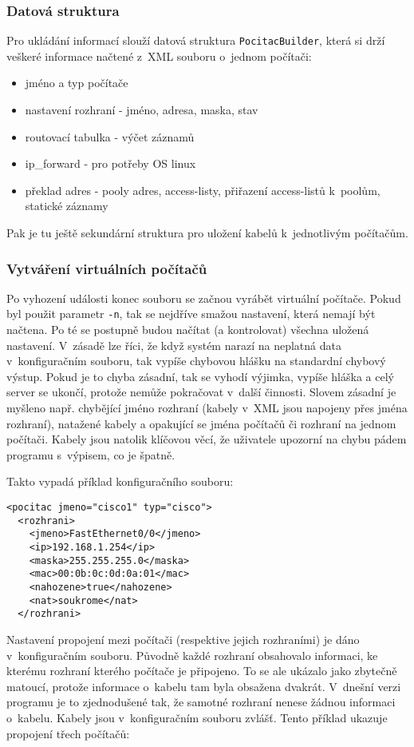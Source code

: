 \subsubsection{Datová struktura}
Pro ukládání informací slouží datová struktura \verb|PocitacBuilder|, která si drží veškeré informace načtené z~XML souboru o~jednom počítači:
\begin{itemize}
 \item jméno a typ počítače
 \item nastavení rozhraní - jméno, adresa, maska, stav
 \item routovací tabulka - výčet záznamů
 \item ip\_forward - pro potřeby OS linux
 \item překlad adres - pooly adres, access-listy, přiřazení access-listů k~poolům, statické záznamy
\end{itemize}

Pak je tu ještě sekundární struktura pro uložení kabelů k~jednotlivým počítačům.

\subsubsection{Vytváření virtuálních počítačů}
Po vyhození události konec souboru se začnou vyrábět virtuální počítače. Pokud byl použit parametr \verb|-n|, tak se nejdříve smažou nastavení, která nemají být načtena. Po té se postupně budou načítat (a kontrolovat) všechna uložená nastavení. V~zásadě lze říci, že když systém narazí na neplatná data v~konfiguračním souboru, tak vypíše chybovou hlášku na standardní chybový výstup. Pokud je to chyba zásadní, tak se vyhodí výjimka, vypíše hláška a celý server se ukončí, protože nemůže pokračovat v~další činnosti. Slovem zásadní je myšleno např. chybějící jméno rozhraní (kabely v~XML jsou napojeny přes jména rozhraní), natažené kabely a opakující se jména počítačů či rozhraní na jednom počítači. Kabely jsou natolik klíčovou věcí, že uživatele upozorní na chybu pádem programu s~výpisem, co je špatně. 

Takto vypadá příklad konfiguračního souboru:
\begin{verbatim}
<pocitac jmeno="cisco1" typ="cisco">
  <rozhrani>
    <jmeno>FastEthernet0/0</jmeno>
    <ip>192.168.1.254</ip>
    <maska>255.255.255.0</maska>
    <mac>00:0b:0c:0d:0a:01</mac>
    <nahozene>true</nahozene>
    <nat>soukrome</nat>
  </rozhrani>
\end{verbatim} 

Nastavení propojení mezi počítači (respektive jejich rozhraními) je dáno v~konfiguračním souboru. Původně každé rozhraní obsahovalo informaci, ke kterému rozhraní kterého počítače je připojeno. To se ale ukázalo jako zbytečně matoucí, protože informace o~kabelu tam byla obsažena dvakrát. V~dnešní verzi programu je to zjednodušené tak, že samotné rozhraní nenese žádnou informaci o~kabelu. Kabely jsou v~konfiguračním souboru zvlášť. Tento příklad ukazuje propojení třech počítačů:

